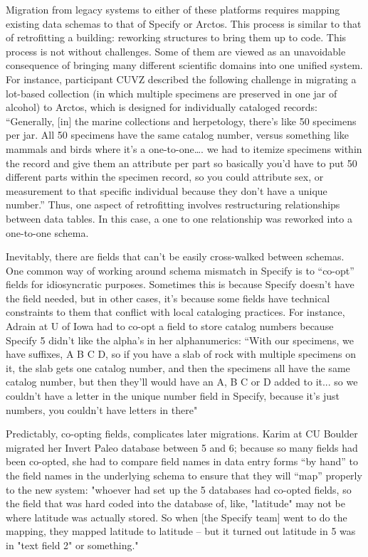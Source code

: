 Migration from legacy systems to either of these platforms requires mapping existing data schemas to that of Specify or Arctos. This process is similar to that of retrofitting a building: reworking structures to bring them up to code. This process is not without challenges. Some of them are viewed as an unavoidable consequence of bringing many different scientific domains into one unified system. For instance, participant CUVZ described the following challenge in migrating a lot-based collection (in which multiple specimens are preserved in one jar of alcohol) to Arctos, which is designed for individually cataloged records:
“Generally, [in] the marine collections and herpetology, there's like 50 specimens per jar. All 50 specimens have the same catalog number, versus something like mammals and birds where it's a one-to-one…. we had to itemize specimens within the record and give them an attribute per part so basically you'd have to put 50 different parts within the specimen record, so you could attribute sex, or measurement to that specific individual because they don't have a unique number.”
Thus, one aspect of retrofitting involves restructuring relationships between data tables.  In this case, a one to one relationship was reworked into a one-to-one schema.

Inevitably, there are fields that can’t be easily cross-walked between schemas.
One common way of working around schema mismatch in Specify is to “co-opt” fields for idiosyncratic purposes. Sometimes this is because Specify doesn’t have the field needed, but in other cases, it’s because some fields have technical constraints to them that conflict with local cataloging practices.  For instance, Adrain at U of Iowa had to co-opt a field to store catalog numbers because Specify 5 didn’t like the alpha’s in her alphanumerics:  
“With our specimens, we have suffixes, A B C D, so if you have a slab of rock with multiple specimens on it, the slab gets one catalog number, and then the specimens all have the same catalog number, but then they'll would have an A, B C or D added to it... so we couldn't have a letter in the unique number field in Specify, because it's just numbers, you couldn't have letters in there"

Predictably, co-opting fields, complicates later migrations. Karim at CU Boulder migrated her Invert Paleo database between 5 and 6; because so many fields had been co-opted, she had to compare field names in data entry forms “by hand” to the field names in the underlying schema to ensure that they will “map” properly to the new system: 
"whoever had set up the 5 databases had co-opted fields, so the field that was hard coded into the database of, like, "latitude" may not be where latitude was actually stored.  So when [the Specify team] went to do the mapping, they mapped latitude to latitude -- but it turned out latitude in 5 was in "text field 2" or something." 

